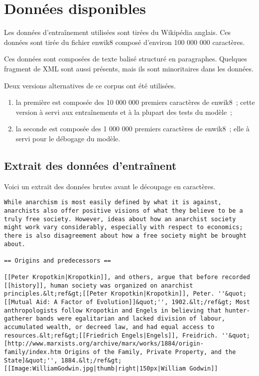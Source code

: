 \chapter{Données disponibles}
Les données d'entraînement utilisées sont tirées du Wikipédia anglais.
Ces données sont tirée du fichier \og enwik8\fg{}\autocite{enwik8} composé d'environ 100 000 000 caractères.

Ces données sont composées de texte balisé structuré en paragraphes.
Quelques fragment de XML sont aussi présents, mais ils sont minoritaires dans les données. %

Deux versions alternatives de ce corpus ont été utilisées.
\begin{enumerate}
	\item la première est composée des 10 000 000 premiers caractères de \og enwik8\fg{}~; cette version à servi aux entraînements et à la plupart des tests du modèle~; %
	\item la seconde est composée des 1 000 000 premiers caractères de \og enwik8\fg{}~; elle à servi pour le débogage du modèle. %
\end{enumerate}

\section{Extrait des données d'entraînent}
Voici un extrait des données brutes avant le découpage en caractères.

\begin{lstlisting}[caption={Extrait des premières lignes du fichier enwik8, correspondant à l'article sur l'ansarchisme.},label=enwik8_ex]
While anarchism is most easily defined by what it is against, anarchists also offer positive visions of what they believe to be a truly free society. However, ideas about how an anarchist society might work vary considerably, especially with respect to economics; there is also disagreement about how a free society might be brought about. 

== Origins and predecessors ==

[[Peter Kropotkin|Kropotkin]], and others, argue that before recorded [[history]], human society was organized on anarchist principles.&lt;ref&gt;[[Peter Kropotkin|Kropotkin]], Peter. ''&quot;[[Mutual Aid: A Factor of Evolution]]&quot;'', 1902.&lt;/ref&gt; Most anthropologists follow Kropotkin and Engels in believing that hunter-gatherer bands were egalitarian and lacked division of labour, accumulated wealth, or decreed law, and had equal access to resources.&lt;ref&gt;[[Friedrich Engels|Engels]], Freidrich. ''&quot;[http://www.marxists.org/archive/marx/works/1884/origin-family/index.htm Origins of the Family, Private Property, and the State]&quot;'', 1884.&lt;/ref&gt;
[[Image:WilliamGodwin.jpg|thumb|right|150px|William Godwin]]
\end{lstlisting}

